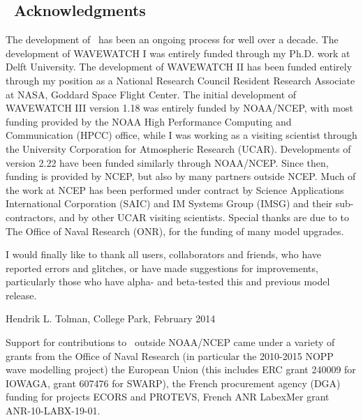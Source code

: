 \vssub
\subsection{~Acknowledgments}
\vssub

The development of \ws\ has been an ongoing process for well over a
decade. The development of WAVEWATCH I was entirely funded through my
Ph.D. work at Delft University. The development of WAVEWATCH II has been
funded entirely through my position as a National Research Council Resident
Research Associate at NASA, Goddard Space Flight Center. The initial
development of WAVEWATCH III version 1.18 was entirely funded by NOAA/NCEP,
with most funding provided by the NOAA High Performance Computing and
Communication (HPCC) office, while I was working as a visiting scientist
through the University Corporation for Atmospheric Research (UCAR).
Developments of version 2.22 have been funded similarly through NOAA/NCEP.
Since then, funding is provided by NCEP, but also by many partners outside
NCEP. Much of the work at NCEP has been performed under contract by Science
Applications International Corporation (SAIC) and IM Systems Group (IMSG) and
their sub-contractors, and by other UCAR visiting scientists.  Special thanks
are due to to The Office of Naval Research (ONR), for the funding of many
model upgrades.

I would finally like to thank all users, collaborators and friends, who have
reported errors and glitches, or have made suggestions for improvements,
particularly those who have alpha- and beta-tested this and previous model
release.

\vspace{\baselineskip}
\vspace{\baselineskip} 
\strut \hfill Hendrik L. Tolman, College Park, February 2014

\vspace{\baselineskip}
\vspace{\baselineskip} 
Support for contributions to  \ws\ outside NOAA/NCEP came under a variety of grants from the Office of Naval Research (in particular 
the 2010-2015 NOPP wave modelling project) the European Union (this includes ERC grant 240009 for IOWAGA,  grant 607476 for SWARP), 
the French 
procurement agency (DGA) funding for projects ECORS and PROTEVS, French ANR LabexMer grant ANR-10-LABX-19-01.